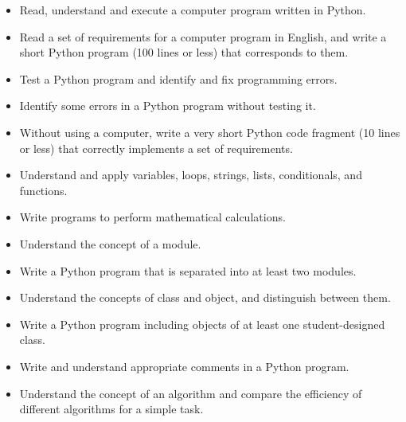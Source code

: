 \documentclass{article}
\begin{document}
\begin{itemize}
\item Read, understand and execute a computer program written in Python.
\item Read a set of requirements for a computer program in English, and
    write a short Python program (100 lines or less) that corresponds to
    them.
\item Test a Python program and identify and fix programming errors.
\item Identify some errors in a Python program without testing it.
\item Without using a computer, write a very short Python code fragment
    (10 lines or less) that correctly implements a set of requirements.
\item Understand and apply variables, loops, strings, lists, conditionals,
    and functions.
\item Write programs to perform mathematical calculations.
\item Understand the concept of a module.
\item Write a Python program that is separated into at least two modules.
\item Understand the concepts of class and object, and distinguish between
    them.
\item Write a Python program including objects of at least one
    student-designed class.
\item Write and understand appropriate comments in a Python program.
\item Understand the concept of an algorithm and compare the efficiency of
    different algorithms for a simple task.
\end{itemize}
\end{document}
